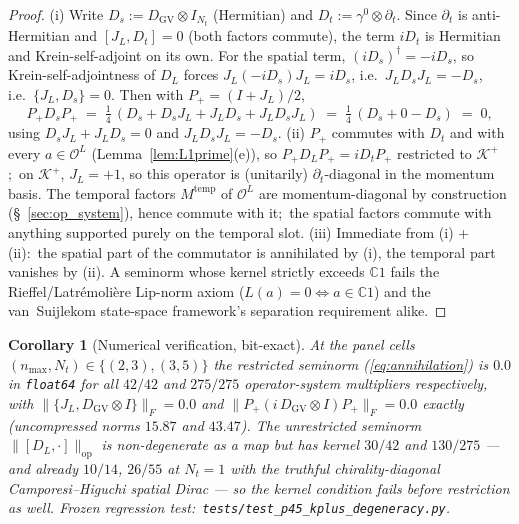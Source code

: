 \documentclass[11pt,a4paper]{article}
\theoremstyle{plain}
\newtheorem{corollary}[theorem]{Corollary}
\theoremstyle{definition}
\newcommand{\nmax}{n_{\max}}
\newcommand{\Nt}{N_{t}}
\newcommand{\Krein}{\mathcal{K}}
\newcommand{\Op}{\mathcal{O}}
\newcommand{\opnorm}[1]{\lVert #1 \rVert_{\mathrm{op}}}
\newcommand{\norm}[1]{\lVert #1 \rVert}
\newcommand{\C}{\mathbb{C}}
\newcommand{\DGV}{D_{\mathrm{GV}}}
\newcommand{\DL}{D_{L}}
\newcommand{\JL}{J_{L}}
\newcommand{\Kplus}{\Krein^{+}}
\newcommand{\Pplus}{P_{+}}
\newcommand{\temp}{\mathrm{temp}}
\begin{document}
\begin{proof}
(i) Write $D_{s} := \DGV \otimes I_{\Nt}$ (Hermitian) and $D_{t} :=
\gamma^{0} \otimes \partial_{t}$. Since $\partial_{t}$ is
anti-Hermitian and $[\JL, D_{t}] = 0$ (both factors commute), the term
$i D_{t}$ is Hermitian and Krein-self-adjoint on its own. For the
spatial term, $(i D_{s})^{\dagger} = -i D_{s}$, so
Krein-self-adjointness of $\DL$ forces
$\JL(-i D_{s})\JL = i D_{s}$, i.e.\ $\JL D_{s} \JL = -D_{s}$,
i.e.\ $\{\JL, D_{s}\} = 0$. Then with $\Pplus = (I + \JL)/2$,
\begin{equation*}
   \Pplus D_{s} \Pplus
   \;=\; \tfrac14\,(D_{s} + D_{s}\JL + \JL D_{s} + \JL D_{s} \JL)
   \;=\; \tfrac14\,(D_{s} + 0 - D_{s})
   \;=\; 0,
\end{equation*}
using $D_{s}\JL + \JL D_{s} = 0$ and $\JL D_{s} \JL = -D_{s}$.
(ii) $\Pplus$ commutes with $D_{t}$ and with every $a \in \Op^{L}$
(Lemma~\ref{lem:L1prime}(e)), so $\Pplus \DL \Pplus = i D_{t} \Pplus$
restricted to $\Kplus$;\ on $\Kplus$, $\JL = +1$, so this operator is
(unitarily) $\partial_{t}$-diagonal in the momentum basis. The
temporal factors $M^{\temp}$ of $\Op^{L}$ are momentum-diagonal by
construction (\S~\ref{sec:op_system}), hence commute with it;\ the
spatial factors commute with anything supported purely on the temporal
slot. (iii) Immediate from (i) + (ii):\ the spatial part of the
commutator is annihilated by (i), the temporal part vanishes by (ii).
A seminorm whose kernel strictly exceeds $\C 1$ fails the
Rieffel/Latr\'emoli\`ere Lip-norm axiom ($L(a) = 0 \Leftrightarrow
a \in \C 1$) and the van~Suijlekom state-space framework's
separation requirement alike. \qedhere
\end{proof}

\begin{corollary}[Numerical verification, bit-exact]
\label{cor:annihilation_numerics}
At the panel cells $(\nmax, \Nt) \in \{(2, 3), (3, 5)\}$ the
restricted seminorm (\ref{eq:annihilation}) is $0.0$ in
\texttt{float64} for all $42/42$ and $275/275$ operator-system
multipliers respectively, with
$\norm{\{\JL, \DGV \otimes I\}}_{F} = 0.0$ and
$\norm{\Pplus(i\,\DGV \otimes I)\Pplus}_{F} = 0.0$ exactly
(uncompressed norms $15.87$ and $43.47$). The \emph{unrestricted}
seminorm $\opnorm{[\DL, \cdot]}$ is non-degenerate as a map but has
kernel $30/42$ and $130/275$ — and already $10/14$, $26/55$ at
$\Nt = 1$ with the truthful chirality-diagonal Camporesi--Higuchi
spatial Dirac — so the kernel condition fails before restriction as
well. Frozen regression test:\ \texttt{tests/test\_p45\_kplus\_degeneracy.py}.
\end{corollary}
\end{document}

